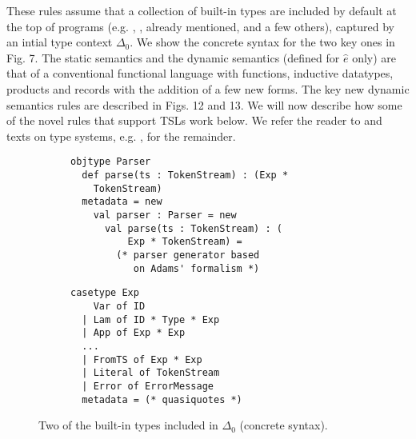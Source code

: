 These rules assume that a collection of built-in types are included by default at the top of programs (e.g. , ,  already mentioned, and a few others), captured by an intial type context $\Delta_0$. We show the concrete syntax for the two key ones in Fig. 7. The static semantics and the dynamic semantics (defined for $\hat{e}$ only) are that of a conventional functional language with functions, inductive datatypes, products and records  with the addition of a few new forms. The key new dynamic semantics rules are described in Figs. 12 and 13. We will now describe how some of the novel rules that support TSLs work below. We refer the reader to \cite{Lovas08abidirectional} and texts on type systems, e.g. \cite{pfpl,tapl}, for the remainder.

\begin{figure}[t]
\begin{subfigure}[t]{.55\textwidth}
\begin{lstlisting}
objtype Parser                          
  def parse(ts : TokenStream) : (Exp * 
    TokenStream)
  metadata = new                        
    val parser : Parser = new           
      val parse(ts : TokenStream) : (
          Exp * TokenStream) =            
        (* parser generator based
           on Adams' formalism *)
\end{lstlisting}
\end{subfigure}
\begin{subfigure}[t]{.55\textwidth}
\begin{lstlisting}[linewidth=.5\textwidth]
casetype Exp 
    Var of ID
  | Lam of ID * Type * Exp
  | App of Exp * Exp
  ... 
  | FromTS of Exp * Exp
  | Literal of TokenStream
  | Error of ErrorMessage
  metadata = (* quasiquotes *)
\end{lstlisting}
\end{subfigure}
\caption{Two of the built-in types included in $\Delta_0$ (concrete syntax).}
\vspace{-10px}
\end{figure}
